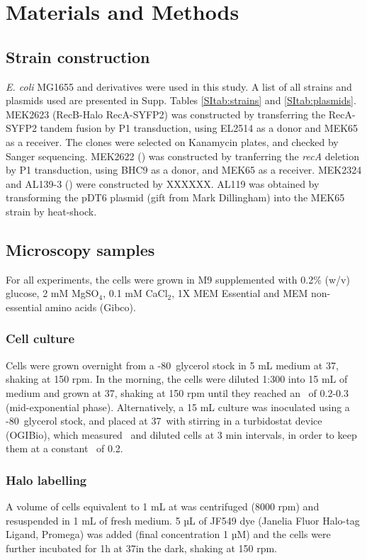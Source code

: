\section*{Materials and Methods}

\subsection*{Strain construction}
\textit{E. coli} MG1655 and derivatives were used in this study. A list of all strains and plasmids used are presented in Supp. Tables \ref{SItab:strains} and \ref{SItab:plasmids}.
MEK2623 (RecB-Halo RecA-SYFP2) was constructed by transferring the RecA-SYFP2 tandem fusion by P1 transduction, using EL2514\cite{Wiktor2021} as a donor and MEK65\cite{Lepore2019a} as a receiver. The clones were selected on Kanamycin plates, and checked by Sanger sequencing. MEK2622 (\dreca) was constructed by tranferring the \textit{recA} deletion by P1 transduction, using BHC9 as a donor, and MEK65 as a receiver. MEK2324 and AL139-3 (\teneighty) were constructed by XXXXXX. AL119 was obtained by transforming the pDT6 plasmid (gift from Mark Dillingham) into the MEK65 strain by heat-shock.

\subsection*{Microscopy samples}
For all experiments, the cells were grown in M9 supplemented with 0.2\% (w/v) glucose, 2 mM MgSO$_4$, 0.1 mM CaCl$_2$, 1X MEM Essential and MEM non-essential amino acids (Gibco).
\subsubsection*{Cell culture}
Cells were grown overnight from a -80\celsius\ glycerol stock in 5 mL medium at 37\celsius, shaking at 150 rpm. In the morning, the cells were diluted 1:300 into 15 mL of medium and grown at 37\celsius, shaking at 150 rpm until they reached an \od\ of 0.2-0.3 (mid-exponential phase).
Alternatively, a 15 mL culture was inoculated using a -80\celsius\ glycerol stock, and placed at 37\celsius\ with stirring in a turbidostat device (OGIBio), which measured \od\ and diluted cells at 3 min intervals, in order to keep them at a constant \od\ of 0.2.
\subsubsection*{Halo labelling}
A volume of cells equivalent to 1 mL at  was centrifuged (8000 rpm) and resuspended in 1 mL of fresh medium. 5 µL of JF549 dye (Janelia Fluor Halo-tag Ligand, Promega) was added (final concentration 1 µM) and the cells were further incubated for 1h at 37\celsius in the dark, shaking at 150 rpm.
